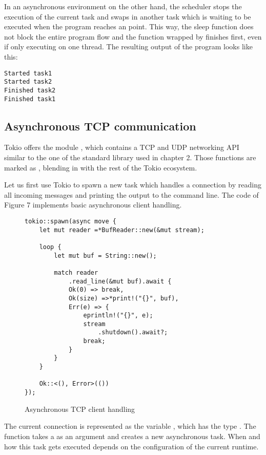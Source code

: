 In an asynchronous environment on the other hand, the scheduler stops the execution of the current task and swaps in
another task which is waiting to be executed when the program reaches an  point. This way, the sleep
function does not block the entire program flow and the function wrapped by  finishes first, even if only
executing on one thread. The resulting output of the program looks like this:

\begin{verbatim}
Started task1
Started task2
Finished task2
Finished task1
\end{verbatim}

\subsection{Asynchronous TCP communication}
Tokio offers the module , which contains a TCP and UDP networking API similar to the one of the
standard library used in chapter 2. Those functions are marked as , blending in with the rest of the Tokio
ecosystem.

Let us first use Tokio to spawn a new task which handles a connection by reading all incoming messages and printing the
output to the command line. The code of Figure 7 implements basic asynchronous client handling.

\begin{figure}[ht]
    \begin{verbatim}
tokio::spawn(async move {
    let mut reader =*BufReader::new(&mut stream);

    loop {
        let mut buf = String::new();

        match reader
            .read_line(&mut buf).await {
            Ok(0) => break,
            Ok(size) =>*print!("{}", buf),
            Err(e) => {
                eprintln!("{}", e);
                stream
                    .shutdown().await?;
                break;
            }
        }
    }

    Ok::<(), Error>(())
});
    \end{verbatim}
    \caption{Asynchronous TCP client handling}
\end{figure}

The current connection is represented as the variable , which has the type .
The function  takes a  as an argument and creates a new asynchronous task. When and how
this task gets executed depends on the configuration of the current runtime.

